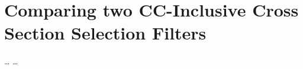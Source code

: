 \chapter{Comparing two CC-Inclusive Cross Section Selection Filters}\label{ch:selImodcompare}
\dots
\clearpage
\dots
